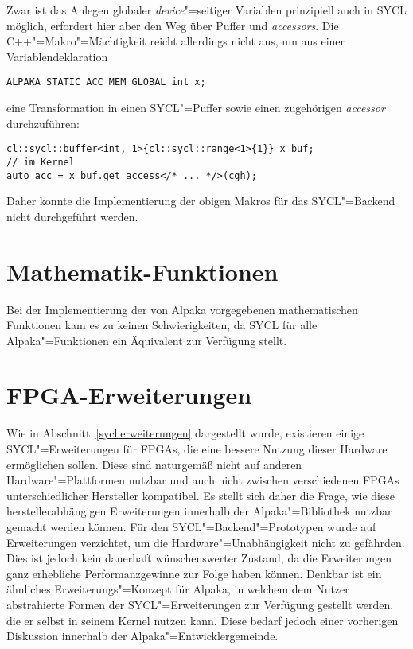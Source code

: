 Zwar ist das Anlegen globaler \textit{device}"=seitiger Variablen prinzipiell
auch in SYCL möglich, erfordert hier aber den Weg über Puffer und
\textit{accessors}. Die C++"=Makro"=Mächtigkeit reicht allerdings nicht aus, um
aus einer Variablendeklaration

\begin{code}
    \begin{verbatim}
ALPAKA_STATIC_ACC_MEM_GLOBAL int x;
    \end{verbatim}
\end{code}

eine Transformation in einen SYCL"=Puffer sowie einen zugehörigen
\textit{accessor} durchzuführen:

\begin{code}
    \begin{verbatim}
cl::sycl::buffer<int, 1>{cl::sycl::range<1>{1}} x_buf;
// im Kernel
auto acc = x_buf.get_access</* ... */>(cgh);
    \end{verbatim}
\end{code}

Daher konnte die Implementierung der obigen Makros für das SYCL"=Backend nicht
durchgeführt werden.

\section{Mathematik-Funktionen}

Bei der Implementierung der von Alpaka vorgegebenen mathematischen Funktionen
kam es zu keinen Schwierigkeiten, da SYCL für alle Alpaka"=Funktionen ein
Äquivalent zur Verfügung stellt.

\section{FPGA-Erweiterungen}\label{implementierung:probleme:fpga}

Wie in Abschnitt~\ref{sycl:erweiterungen} dargestellt wurde, existieren einige
SYCL"=Erweiterungen für FPGAs, die eine bessere Nutzung dieser Hardware
ermöglichen sollen. Diese sind naturgemäß nicht auf anderen
Hardware"=Plattformen nutzbar und auch nicht zwischen verschiedenen
FPGAs unterschiedlicher Hersteller kompatibel. Es stellt sich daher die Frage,
wie diese herstellerabhängigen Erweiterungen innerhalb der Alpaka"=Bibliothek
nutzbar gemacht werden können. Für den SYCL"=Backend"=Prototypen wurde auf
Erweiterungen verzichtet, um die Hardware"=Unabhängigkeit nicht zu gefährden.
Dies ist jedoch kein dauerhaft wünschenswerter Zustand, da die Erweiterungen
ganz erhebliche Performanzgewinne zur Folge haben können. Denkbar ist ein
ähnliches Erweiterungs"=Konzept für Alpaka, in welchem dem Nutzer abstrahierte
Formen der SYCL"=Erweiterungen zur Verfügung gestellt werden, die er selbst in
seinem Kernel nutzen kann. Diese bedarf jedoch einer vorherigen Diskussion
innerhalb der Alpaka"=Entwicklergemeinde.

